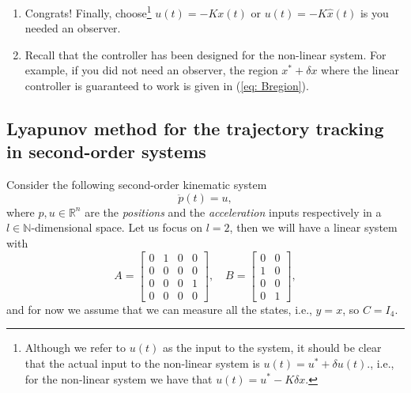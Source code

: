 \documentclass[11pt,a4paper,titlepage]{article}
\begin{document}
\begin{enumerate}
\item Congrats! Finally, choose\footnote{Although we refer to $u(t)$ as the input to the system, it should be clear that the actual input to the non-linear system is $u(t) = u^* + \delta u(t).$, i.e., for the non-linear system we have that $u(t) = u^* -K\delta x$.} $u(t) = -Kx(t)$ or $u(t) = -K\hat x(t)$ is you needed an observer.
\item Recall that the controller has been designed for the non-linear system.
	For example, if you did not need an observer, the region $x^* + \delta x$ where the linear controller is guaranteed to work is given in (\ref{eq: Bregion}).
\end{enumerate}


\subsection{Lyapunov method for the trajectory tracking in second-order systems}
Consider the following second-order kinematic system
\begin{equation}
	\ddot p(t) = u,
	\label{eq: pdyn}
\end{equation}
where $p,u\in\mathbb{R}^n$ are the \emph{positions} and the \emph{acceleration} inputs respectively in a $l\in\mathbb{N}$-dimensional space. Let us focus on $l=2$, then we will have a linear system with
\begin{equation}
	A = \begin{bmatrix}0 & 1 & 0 & 0 \\ 0 & 0 & 0 & 0 \\
		0 & 0 & 0 & 1 \\ 0 & 0 & 0 & 0 \end{bmatrix}, \quad B = \begin{bmatrix}0 & 0  \\ 1 & 0  \\ 0 & 0 \\ 0 & 1\end{bmatrix},
\end{equation}
and for now we assume that we can measure all the states, i.e., $y = x$, so $C = I_4$.
\end{document}

